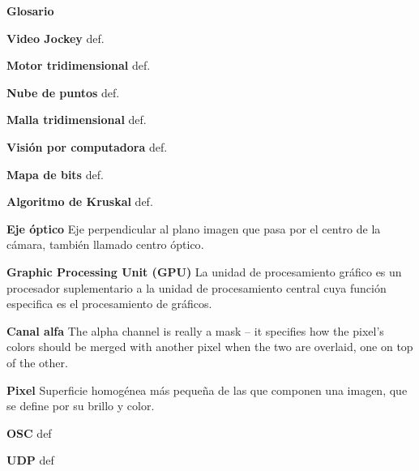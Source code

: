 ﻿\Huge
\textbf{Glosario}

\vspace{10 mm}

\normalsize 

\textbf{Video Jockey}
def. %

\textbf{Motor tridimensional}
def.
 
\textbf{Nube de puntos}
def.

\textbf{Malla tridimensional}
def.

\textbf{Visión por computadora}
def.

\textbf{Mapa de bits}
def.

\textbf{Algoritmo de Kruskal}
def.

\textbf{Eje óptico} 
Eje perpendicular al plano imagen que pasa por el centro de la cámara, también llamado centro óptico\cite{OpticalDesign}.

\textbf{Graphic Processing Unit (GPU)}\cite{GPUWork}
La unidad de procesamiento gráfico es un procesador suplementario a la unidad de procesamiento central cuya función especifica es el procesamiento de gráficos.

\textbf{Canal alfa}
The alpha channel is really a mask -- it specifies how the pixel's colors should be merged with another pixel when the two are overlaid, one on top of the other. 

\textbf{Pixel}
Superficie homogénea más pequeña de las que componen una imagen, que se define por su brillo y color\cite{RAE}.

\textbf{OSC}
def

\textbf{UDP}
def